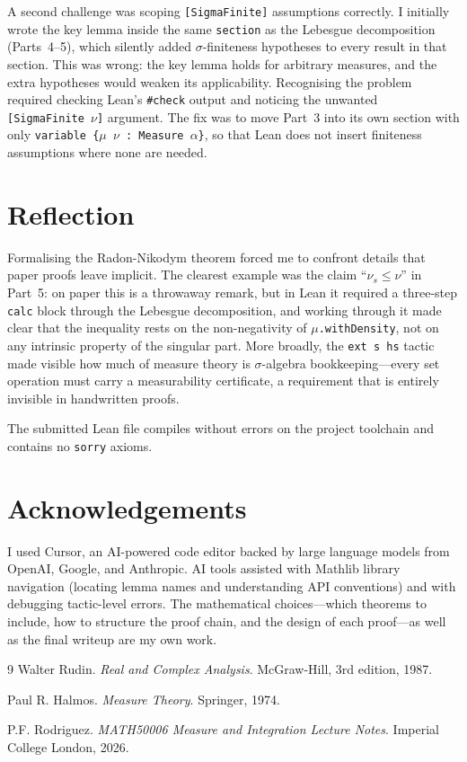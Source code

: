 \documentclass[11pt]{article}
\begin{document}
A second challenge was scoping \texttt{[SigmaFinite]} assumptions correctly. I initially wrote the key lemma inside the same \texttt{section} as the Lebesgue decomposition (Parts~4--5), which silently added $\sigma$-finiteness hypotheses to every result in that section. This was wrong: the key lemma holds for arbitrary measures, and the extra hypotheses would weaken its applicability. Recognising the problem required checking Lean's \texttt{\#check} output and noticing the unwanted \texttt{[SigmaFinite~$\nu$]} argument. The fix was to move Part~3 into its own section with only \texttt{variable~\{$\mu$~$\nu$~:~Measure~$\alpha$\}}, so that Lean does not insert finiteness assumptions where none are needed.

\section{Reflection}

Formalising the Radon-Nikodym theorem forced me to confront details that paper proofs leave implicit. The clearest example was the claim ``$\nu_s \le \nu$'' in Part~5: on paper this is a throwaway remark, but in Lean it required a three-step \texttt{calc} block through the Lebesgue decomposition, and working through it made clear that the inequality rests on the non-negativity of \texttt{$\mu$.withDensity}, not on any intrinsic property of the singular part. More broadly, the \texttt{ext~s~hs} tactic made visible how much of measure theory is $\sigma$-algebra bookkeeping---every set operation must carry a measurability certificate, a requirement that is entirely invisible in handwritten proofs.

The submitted Lean file compiles without errors on the project toolchain and contains no \texttt{sorry} axioms.

\section*{Acknowledgements}

I used Cursor, an AI-powered code editor backed by large language models from OpenAI, Google, and Anthropic. AI tools assisted with Mathlib library navigation (locating lemma names and understanding API conventions) and with debugging tactic-level errors. The mathematical choices---which theorems to include, how to structure the proof chain, and the design of each proof---as well as the final writeup are my own work.

\begin{thebibliography}{9}
Walter Rudin.
\textit{Real and Complex Analysis}.
McGraw-Hill, 3rd edition, 1987.

Paul R. Halmos.
\textit{Measure Theory}.
Springer, 1974.

P.F. Rodriguez.
\textit{MATH50006 Measure and Integration Lecture Notes}.
Imperial College London, 2026.
\end{thebibliography}
\end{document}
